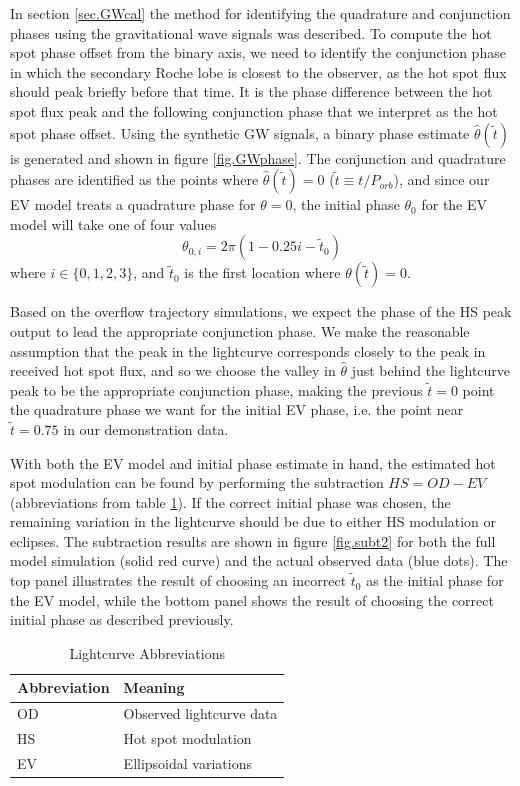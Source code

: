 \documentclass[preprint2]{aastex}
\begin{document}
In section \ref{sec.GWcal} the method for identifying the quadrature and conjunction phases using the gravitational wave signals was described. To compute the hot spot phase offset from the binary axis, we need to identify the conjunction phase in which the secondary Roche lobe is closest to the observer, as  the hot spot flux should peak briefly before that time. It is the phase difference between the hot spot flux peak and the following conjunction phase that we interpret as the hot spot phase offset. Using the synthetic GW signals, a binary phase estimate $\hat{\theta}(\tilde{t})$ is generated and shown in
figure \ref{fig.GWphase}. The conjunction and quadrature phases are
identified as the points where $\hat{\theta}(\tilde{t}) = 0$ ($\tilde{t} \equiv t/P_{orb}$), and since our EV model treats a quadrature phase for $\theta=0$, the
initial phase $\theta_0$ for the EV model will take one of four values
\begin{equation}
   \theta_{0,i} = 2\pi(1-0.25i-\tilde{t}_0)
\end{equation}
where $i \in \lbrace 0,1,2,3 \rbrace$, and $\tilde{t}_0$ is the first location where
$\theta(\tilde{t})=0$.

 Based on the overflow trajectory simulations, we expect the
phase of the HS peak output to lead the appropriate conjunction
phase. We make the reasonable assumption that the peak in the lightcurve corresponds closely to the peak in received hot spot flux, and so we choose the valley in $\hat{\theta}$ just behind the lightcurve peak to be the appropriate conjunction phase, making the previous $\tilde{t}=0$ point the quadrature phase we want for the initial EV phase, i.e. the point near $\tilde{t}=0.75$ in our demonstration data.

With both the EV model and initial phase estimate in hand, the estimated hot
spot modulation can be found by performing the subtraction $HS = OD - EV$ (abbreviations from table \ref{table.abbrev}). If the correct initial phase was chosen, the remaining variation in the lightcurve should be due to either HS modulation or eclipses. The subtraction results are shown in figure \ref{fig.subt2} for both the full model simulation (solid red curve) and the actual observed data (blue dots). The top panel illustrates the result of choosing an incorrect $\tilde{t}_0$ as the initial phase for the EV model, while the bottom panel shows the result of choosing the correct initial phase as described previously. 

\begin{table}[h]
\caption{Lightcurve Abbreviations}
\centering
\begin{tabular}{l l}
\hline \hline
Abbreviation & Meaning\\
\hline
OD & Observed lightcurve data\\
HS & Hot spot modulation\\
EV & Ellipsoidal variations\\
\hline
\end{tabular}
\label{table.abbrev}
\end{table}
\end{document}
